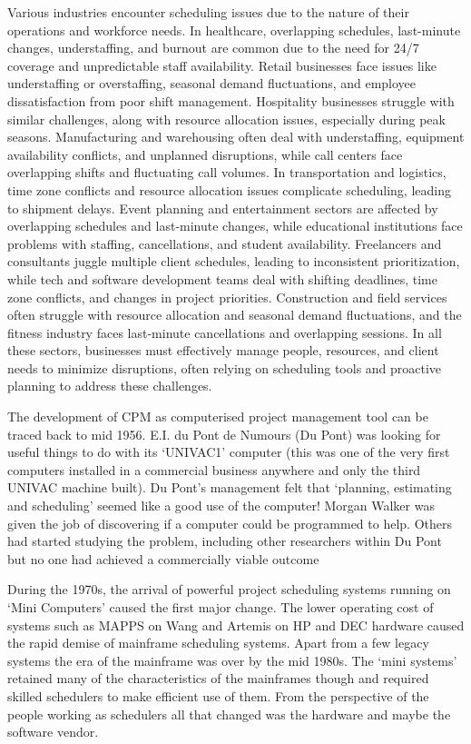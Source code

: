 Various industries encounter scheduling issues due to the nature of their operations and workforce needs. In healthcare, overlapping schedules, last-minute changes, understaffing, and burnout are common due to the need for 24/7 coverage and unpredictable staff availability. Retail businesses face issues like understaffing or overstaffing, seasonal demand fluctuations, and employee dissatisfaction from poor shift management. Hospitality businesses struggle with similar challenges, along with resource allocation issues, especially during peak seasons. Manufacturing and warehousing often deal with understaffing, equipment availability conflicts, and unplanned disruptions, while call centers face overlapping shifts and fluctuating call volumes. In transportation and logistics, time zone conflicts and resource allocation issues complicate scheduling, leading to shipment delays. Event planning and entertainment sectors are affected by overlapping schedules and last-minute changes, while educational institutions face problems with staffing, cancellations, and student availability. Freelancers and consultants juggle multiple client schedules, leading to inconsistent prioritization, while tech and software development teams deal with shifting deadlines, time zone conflicts, and changes in project priorities. Construction and field services often struggle with resource allocation and seasonal demand fluctuations, and the fitness industry faces last-minute cancellations and overlapping sessions. In all these sectors, businesses must effectively manage people, resources, and client needs to minimize disruptions, often relying on scheduling tools and proactive planning to address these challenges.

The development of CPM as computerised project management tool can be traced back to mid 1956. E.I. du Pont de Numours (Du Pont) was looking for useful things to do with its ‘UNIVAC1’ computer (this was one of the very first computers installed in a commercial business anywhere and only the third UNIVAC machine built).
Du Pont’s management felt that ‘planning, estimating and scheduling’ seemed like a good use of the computer! Morgan Walker was given the job of discovering if a computer could be programmed to help. Others had started studying the problem, including other researchers within
Du Pont but no one had achieved a commercially viable outcome

During the 1970s, the arrival of powerful project scheduling systems running on ‘Mini Computers’ caused the first major change. The lower operating cost of systems such as MAPPS on Wang and Artemis on HP and DEC hardware caused the rapid demise of mainframe scheduling systems. Apart from a few legacy systems the era of the mainframe was over by the
mid 1980s. The ‘mini systems’ retained many of the characteristics of the mainframes though and
required skilled schedulers to make efficient use of them. From the perspective of the people
working as schedulers all that changed was the hardware and maybe the software vendor.

